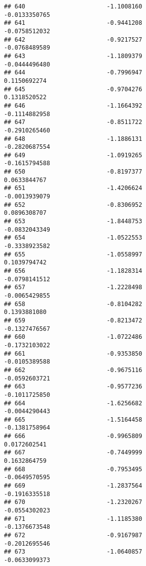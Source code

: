 \documentclass[
]{article}
\begin{document}
\begin{verbatim}
## 640                       -1.1008160                         -0.0133350765
## 641                       -0.9441208                         -0.0758512032
## 642                       -0.9217527                         -0.0768489589
## 643                       -1.1809379                         -0.0444496480
## 644                       -0.7996947                          0.1150692274
## 645                       -0.9704276                          0.1318520522
## 646                       -1.1664392                         -0.1114882958
## 647                       -0.8511722                         -0.2910265460
## 648                       -1.1886131                         -0.2820687554
## 649                       -1.0919265                         -0.1615794588
## 650                       -0.8197377                          0.0633844767
## 651                       -1.4206624                         -0.0013939079
## 652                       -0.8306952                          0.0896308707
## 653                       -1.8448753                         -0.0832043349
## 654                       -1.0522553                         -0.3338923582
## 655                       -1.0558997                          0.1039794742
## 656                       -1.1828314                         -0.0798141512
## 657                       -1.2228498                         -0.0065429855
## 658                       -0.8104282                          0.1393881080
## 659                       -0.8213472                         -0.1327476567
## 660                       -1.0722486                         -0.1732103022
## 661                       -0.9353850                         -0.0105389588
## 662                       -0.9675116                         -0.0592603721
## 663                       -0.9577236                         -0.1011725850
## 664                       -1.6256682                         -0.0044290443
## 665                       -1.5164458                         -0.1381758964
## 666                       -0.9965809                          0.0172602541
## 667                       -0.7449999                          0.1632864759
## 668                       -0.7953495                         -0.0649570595
## 669                       -1.2837564                         -0.1916335518
## 670                       -1.2320267                         -0.0554302023
## 671                       -1.1185380                         -0.1376673548
## 672                       -0.9167987                         -0.2012695546
## 673                       -1.0640857                         -0.0633099373

\end{verbatim}
\end{document}
